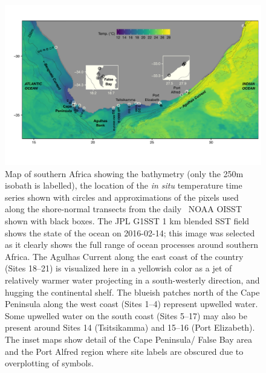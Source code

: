 \documentclass[a4paper,10pt,review]{elsarticle}
\begin{document}
\begin{figure}
\includegraphics[width=1.0\textwidth]{figure1_1km_inset_map_labeled.pdf}
\caption{Map of southern Africa showing the bathymetry (only the 250m isobath is labelled), the location of the \emph{in situ} temperature time series shown with circles and approximations of the pixels used along the shore-normal transects from the daily \degree~NOAA OISST \citep{Reynolds2007} shown with black boxes. The JPL G1SST 1 km blended SST field shows the state of the ocean on 2016-02-14; this image was selected as it clearly shows the full range of ocean processes around southern Africa. The Agulhas Current along the east coast of the country (Sites 18--21) is visualized here in a yellowish color as a jet of relatively warmer water projecting in a south-westerly direction, and hugging the continental shelf. The blueish patches north of the Cape Peninsula along the west coast (Sites 1--4) represent upwelled water. Some upwelled water on the south coast (Sites 5--17) may also be present around Sites 14 (Tsitsikamma) and 15--16 (Port Elizabeth). The inset maps show detail of the Cape Peninsula/ False Bay area and the Port Alfred region where site labels are obscured due to overplotting of symbols.}
\label{fig:Figure1}
\end{figure}
\end{document}
